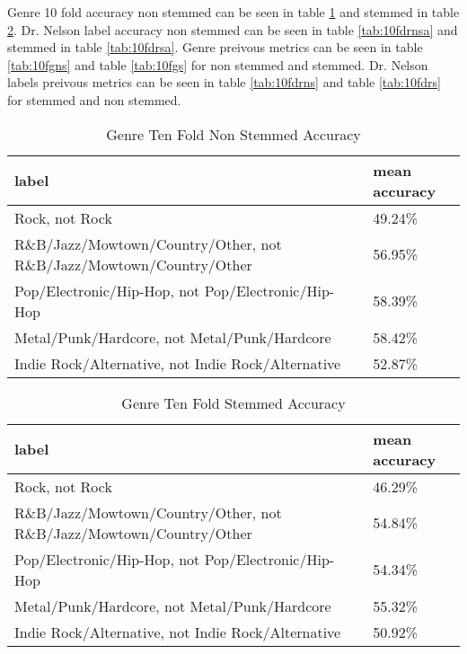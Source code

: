 \documentclass[letterpaper,10pt]{article}
\begin{document}
Genre 10 fold accuracy non stemmed can be seen in table \hyperref[tab:10fgnsa]{\ref{tab:10fgnsa}} and stemmed in table \hyperref[tab:10fgsa]{\ref{tab:10fgsa}}. Dr. Nelson label accuracy non stemmed can be seen in table \hyperref[tab:10fdrnsa]{\ref{tab:10fdrnsa}} and stemmed in table \hyperref[tab:10fdrsa]{\ref{tab:10fdrsa}}. Genre preivous metrics can be seen in table \hyperref[tab:10fgns]{\ref{tab:10fgns}} and table \hyperref[tab:10fgs]{\ref{tab:10fgs}} for non stemmed and stemmed. Dr. Nelson labels preivous metrics can be seen in table \hyperref[tab:10fdrns]{\ref{tab:10fdrns}} and table \hyperref[tab:10fdrs]{\ref{tab:10fdrs}} for stemmed and non stemmed.

\begin{table}[H]
\centering
\begin{tabular}{ll}
\hline
 label                                                              & mean accuracy   \\
\hline
 Rock, not Rock                                                     & 49.24\%          \\
 R\&B/Jazz/Mowtown/Country/Other, not R\&B/Jazz/Mowtown/Country/Other & 56.95\%          \\
 Pop/Electronic/Hip-Hop, not Pop/Electronic/Hip-Hop                 & 58.39\%          \\
 Metal/Punk/Hardcore, not Metal/Punk/Hardcore                       & 58.42\%          \\
 Indie Rock/Alternative, not Indie Rock/Alternative                 & 52.87\%          \\
\hline
\end{tabular}
 \caption{Genre Ten Fold Non Stemmed Accuracy} 
 \label{tab:10fgnsa} 
\end{table}
\begin{table}[H]
\centering
\begin{tabular}{ll}
\hline
 label                                                              & mean accuracy   \\
\hline
 Rock, not Rock                                                     & 46.29\%          \\
 R\&B/Jazz/Mowtown/Country/Other, not R\&B/Jazz/Mowtown/Country/Other & 54.84\%          \\
 Pop/Electronic/Hip-Hop, not Pop/Electronic/Hip-Hop                 & 54.34\%          \\
 Metal/Punk/Hardcore, not Metal/Punk/Hardcore                       & 55.32\%          \\
 Indie Rock/Alternative, not Indie Rock/Alternative                 & 50.92\%          \\
\hline
\end{tabular}
 \caption{Genre Ten Fold Stemmed Accuracy} 
 \label{tab:10fgsa} 
\end{table}
\end{document}
